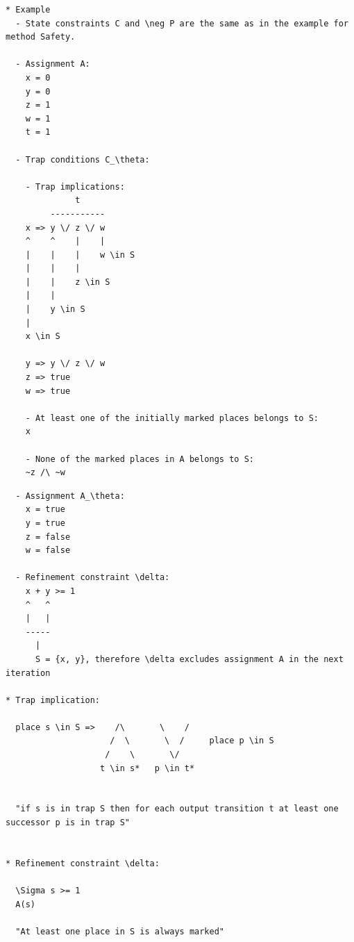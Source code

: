 \documentclass{article}
\begin{document}
\newpage
\begin{verbatim}
* Example
  - State constraints C and \neg P are the same as in the example for method Safety.

  - Assignment A:
    x = 0
    y = 0
    z = 1
    w = 1
    t = 1

  - Trap conditions C_\theta:

    - Trap implications:
              t
         -----------
    x => y \/ z \/ w
    ^    ^    |    |
    |    |    |    w \in S
    |    |    |
    |    |    z \in S
    |    |
    |    y \in S
    |
    x \in S
    
    y => y \/ z \/ w
    z => true
    w => true

    - At least one of the initially marked places belongs to S:
    x

    - None of the marked places in A belongs to S:
    ~z /\ ~w
\end{verbatim}

\newpage

\begin{verbatim}
  - Assignment A_\theta:
    x = true
    y = true
    z = false
    w = false

  - Refinement constraint \delta:
    x + y >= 1
    ^   ^
    |   |
    -----
      |
      S = {x, y}, therefore \delta excludes assignment A in the next iteration

* Trap implication:

  place s \in S =>    /\       \    /
                     /  \       \  /     place p \in S
                    /    \       \/
                   t \in s*   p \in t*   


  "if s is in trap S then for each output transition t at least one successor p is in trap S"


* Refinement constraint \delta:

  \Sigma s >= 1  
  A(s)

  "At least one place in S is always marked"

\end{verbatim}

\newpage
\end{document}

